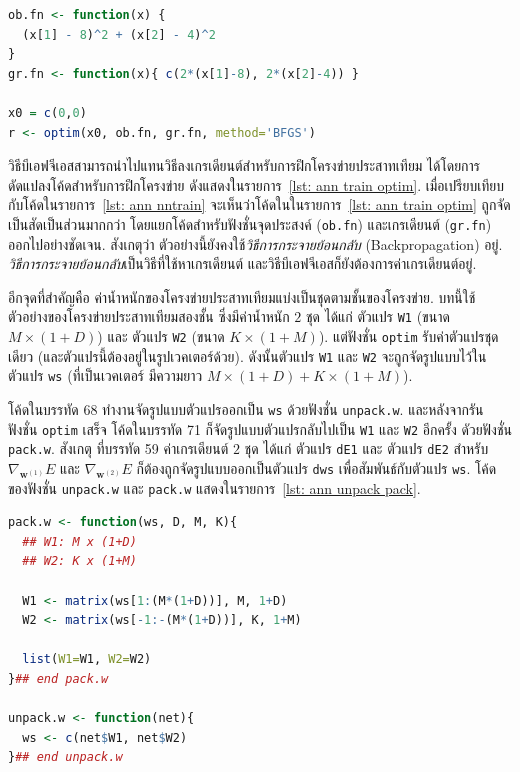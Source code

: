 \begin{lstlisting}[language=R,caption={ตัวอย่างการใช้ฟังชั่น \texttt{optim}},
label={lst: ANN optim examples}]
ob.fn <- function(x) {   
  (x[1] - 8)^2 + (x[2] - 4)^2
}
gr.fn <- function(x){ c(2*(x[1]-8), 2*(x[2]-4)) }

x0 = c(0,0)
r <- optim(x0, ob.fn, gr.fn, method='BFGS')
\end{lstlisting}

วิธีบีเอฟจีเอสสามารถนำไปแทนวิธีลงเกรเดียนต์สำหรับการฝึกโครงข่ายประสาทเทียม
ได้โดยการดัดแปลงโค้ดสำหรับการฝึกโครงข่าย ดังแสดงในรายการ~\ref{lst: ann train optim}.
เมื่อเปรียบเทียบกับโค้ดในรายการ~\ref{lst: ann nntrain} จะเห็นว่าโค้ดในในรายการ~\ref{lst: ann train optim} ถูกจัดเป็นสัดเป็นส่วนมากกว่า 
โดยแยกโค้ดสำหรับฟังชั่นจุดประสงค์ (\texttt{ob.fn}) 
และเกรเดียนต์ (\texttt{gr.fn}) ออกไปอย่างชัดเจน.
สังเกตุว่า ตัวอย่างนี้ยังคงใช้\textit{วิธีการกระจายย้อนกลับ} (Backpropagation) อยู่.
\textit{วิธีการกระจายย้อนกลับ}เป็นวิธีที่ใช้หาเกรเดียนต์ และวิธีบีเอฟจีเอสก็ยังต้องการค่าเกรเดียนต์อยู่.



อีกจุดที่สำคัญคือ ค่าน้ำหนักของโครงข่ายประสาทเทียมแบ่งเป็นชุดตามชั้นของโครงข่าย.
บทนี้ใช้ตัวอย่างของโครงข่ายประสาทเทียมสองชั้น 
ซึ่งมีค่าน้ำหนัก $2$ ชุด ได้แก่ ตัวแปร \texttt{W1} (ขนาด $M \times (1+D)$) และ ตัวแปร \texttt{W2} (ขนาด $K \times (1+M)$).
แต่ฟังชั่น \texttt{optim} รับค่าตัวแปรชุดเดียว (และตัวแปรนี้ต้องอยู่ในรูปเวคเตอร์ด้วย).
ดังนั้นตัวแปร \texttt{W1} และ \texttt{W2} จะถูกจัดรูปแบบไว้ในตัวแปร \texttt{ws} (ที่เป็นเวคเตอร์ มีความยาว $M \times (1+D) + K \times (1+M)$).

โค้ดในบรรทัด 68 ทำงานจัดรูปแบบตัวแปรออกเป็น \texttt{ws} ด้วยฟังชั่น \texttt{unpack.w}.
และหลังจากรันฟังชั่น \texttt{optim} เสร็จ 
โค้ดในบรรทัด 71 ก็จัดรูปแบบตัวแปรกลับไปเป็น \texttt{W1} และ \texttt{W2} อีกครั้ง 
ดัวยฟังชั่น \texttt{pack.w}.
สังเกตุ ที่บรรทัด 59 ค่าเกรเดียนต์ $2$ ชุด ได้แก่ ตัวแปร \texttt{dE1} และ ตัวแปร \texttt{dE2} สำหรับ $\nabla_{\mathbf{w}^{(1)}}E$ และ $\nabla_{\mathbf{w}^{(2)}}E$ ก็ต้องถูกจัดรูปแบบออกเป็นตัวแปร \texttt{dws} เพื่อสัมพันธ์กับตัวแปร \texttt{ws}.
โค้ดของฟังชั่น \texttt{unpack.w} และ \texttt{pack.w} แสดงในรายการ~\ref{lst: ann unpack pack}.

\begin{lstlisting}[language=R,caption={ฟังชั่น \texttt{pack.w} และ \texttt{unpack.w}},
label={lst: ann unpack pack}]
pack.w <- function(ws, D, M, K){
  ## W1: M x (1+D)
  ## W2: K x (1+M)
  
  W1 <- matrix(ws[1:(M*(1+D))], M, 1+D)
  W2 <- matrix(ws[-1:-(M*(1+D))], K, 1+M)
  
  list(W1=W1, W2=W2)
}## end pack.w

unpack.w <- function(net){
  ws <- c(net$W1, net$W2)
}## end unpack.w
\end{lstlisting}

